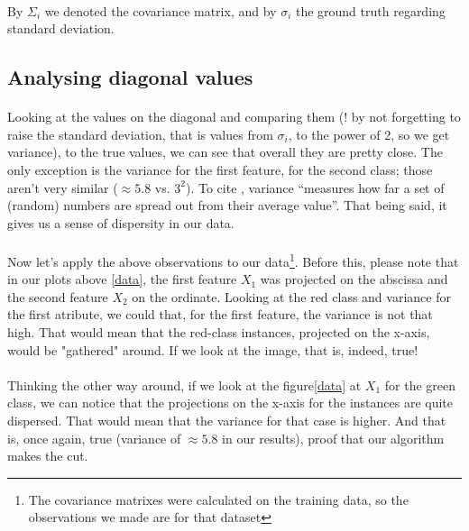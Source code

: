 \paragraph{}
By ${\Sigma}_i$ we denoted the covariance matrix, and by ${\sigma}_i$ the ground truth regarding standard deviation.

\subsection{Analysing diagonal values}
\paragraph{}
Looking at the values on the diagonal and comparing them (! by not forgetting to raise the standard deviation, that is values from ${\sigma}_i$, to the power of 2, so we get variance), to the true values, we can see that overall they are pretty close.
The only exception is the variance for the first feature, for the second class; those aren't very similar ($\approx 5.8$ vs. $3^2$).
To cite \cite{variance}, variance ``measures how far a set of (random) numbers are spread out from their average value''.
That being said, it gives us a sense of dispersity in our data.

\paragraph{}
Now let's apply the above observations to our data\footnote{The covariance matrixes were calculated on the training data, so the observations we made are for that dataset}.
Before this, please note that in our plots above \ref{data}, the first feature $X_1$ was projected on the abscissa and the second feature $X_2$ on the ordinate.
Looking at the red class and variance for the first atribute, we could that, for the first feature, the variance is not that high.
That would mean that the red-class instances, projected on the x-axis, would be "gathered" around.
If we look at the image, that is, indeed, true! 

\paragraph{}
Thinking the other way around, if we look at the figure\ref{data} at $X_1$ for the green class, we can notice that the projections on the x-axis for the instances are quite dispersed.
That would mean that the variance for that case is higher.
And that is, once again, true (variance of $\approx 5.8$ in our results), proof that our algorithm makes the cut.

